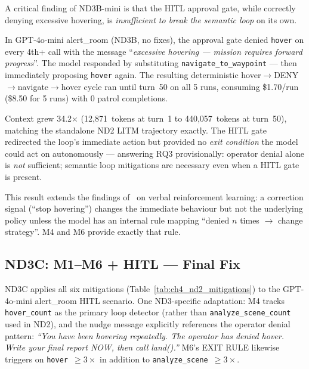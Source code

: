 A critical finding of ND3B-mini is that the HITL approval gate, while correctly denying
excessive hovering, is \emph{insufficient to break the semantic loop} on its own.

In GPT-4o-mini alert\_room (ND3B, no fixes), the approval gate denied \texttt{hover} on
every 4th+ call with the message ``\textit{excessive hovering --- mission requires forward
progress}''.  The model responded by substituting \texttt{navigate\_to\_waypoint} --- then
immediately proposing \texttt{hover} again.  The resulting deterministic
hover$\rightarrow$DENY$\rightarrow$navigate$\rightarrow$hover cycle ran until turn~50 on
all 5 runs, consuming \$1.70/run (\$8.50 for 5 runs) with 0 patrol completions.

Context grew 34.2$\times$ (12,871~tokens at turn~1 to 440,057~tokens at turn~50), matching
the standalone ND2 LITM trajectory exactly.  The HITL gate redirected the loop's immediate
action but provided no \emph{exit condition} the model could act on autonomously ---
answering RQ3 provisionally: operator denial alone is \emph{not} sufficient; semantic
loop mitigations are necessary even when a HITL gate is present.

This result extends the findings of~\citet{reflexion2023} on verbal reinforcement learning:
a correction signal (``stop hovering'') changes the immediate behaviour but not the
underlying policy unless the model has an internal rule mapping ``denied $n$ times
$\rightarrow$ change strategy''.  M4 and M6 provide exactly that rule.

\subsection{ND3C: M1--M6 + HITL --- Final Fix}
\label{sec:ch4_nd3c}

ND3C applies all six mitigations (Table~\ref{tab:ch4_nd2_mitigations}) to the GPT-4o-mini
alert\_room HITL scenario.  One ND3-specific adaptation: M4 tracks \texttt{hover\_count}
as the primary loop detector (rather than \texttt{analyze\_scene\_count} used in ND2),
and the nudge message explicitly references the operator denial pattern:
\textit{``You have been hovering repeatedly.  The operator has denied hover.  Write your
final report NOW, then call land().''}  M6's EXIT RULE likewise triggers on
\texttt{hover $\geq 3\times$} in addition to \texttt{analyze\_scene $\geq 3\times$}.

